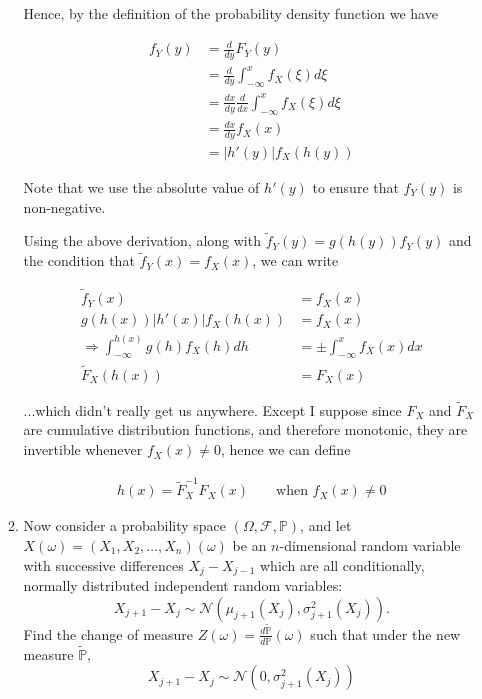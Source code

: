 \documentclass[12pt, a4paper]{article}
\begin{document}
\begin{enumerate}
\begin{enumerate}
        Hence, by the definition of the probability density function we have

        \begin{align*}
            f_Y(y) &= \frac{d}{dy} F_Y(y)\\
            &= \frac{d}{dy} \int_{-\infty}^{x} f_X(\xi)d\xi \\
            &= \frac{dx}{dy} \frac{d}{dx}\int_{-\infty}^{x} f_X(\xi)d\xi \\
            &= \frac{dx}{dy} f_X(x)\\
            &= |h'(y)| f_X(h(y))
        \end{align*}

        Note that we use the absolute value of $h'(y)$ to ensure that $f_Y(y)$ is non-negative. 
        
        Using the above derivation, along with $\tilde f_Y(y) = g(h(y))f_Y(y)$ and the condition that $\tilde f_Y(x) = f_X(x)$, we can write 

        \begin{align*}
            \tilde f_Y(x) &= f_X(x) \\
            g(h(x))|h'(x)|f_X(h(x)) &= f_X(x) \\
            \Rightarrow \int_{-\infty}^{h(x)} g(h)f_X(h) dh &= \pm \int_{-\infty}^x f_X(x)dx \\
            \tilde F_X(h(x)) &= F_X(x)
        \end{align*}

        ...which didn't really get us anywhere. Except I suppose since $F_X$ and $\tilde F_X$ are cumulative distribution functions, and therefore monotonic, they are invertible whenever $f_X(x) \ne 0$, hence we can define

        \begin{align*}
            h(x) = \tilde F_X^{-1} F_X(x) && \text{ when } f_X(x) \ne 0
        \end{align*}

        \item Now consider a probability space $(\Omega, \mathcal F, \mathbb P)$, and let $X(\omega) = (X_1, X_2, \dots, X_n)(\omega)$ be an $n$-dimensional random variable with successive differences $X_j-X_{j-1}$ which are all conditionally, normally distributed independent random variables: $$X_{j+1}-X_j \sim \mathcal N\left( \mu_{j+1}(X_j), \sigma_{j+1}^2(X_j) \right).$$
        Find the change of measure $Z(\omega) = \frac{d \tilde{\mathbb P}}{d \mathbb P}(\omega)$ such that under the new measure $\tilde{\mathbb P}$, $$X_{j+1}-X_j \sim \mathcal N\left(0, \sigma_{j+1}^2(X_j)\right)$$


\end{enumerate}
\end{enumerate}
\end{document}
